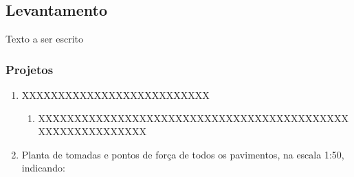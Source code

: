 \subsection{Levantamento} \label{subsection: etapa-LV}

Texto a ser escrito

\subsubsection{Projetos}
	\begin{enumerate}

		\item XXXXXXXXXXXXXXXXXXXXXXXXXX
			\begin{enumerate}
				
				\item XXXXXXXXXXXXXXXXXXXXXXXXXXXXXXXXXXXXXXXXXXXXXXXXXXXXXXXXXX
			
			\end{enumerate}
		
		\item Planta de tomadas e pontos de força de todos os pavimentos, na escala 1:50, indicando:
	\end{enumerate}

